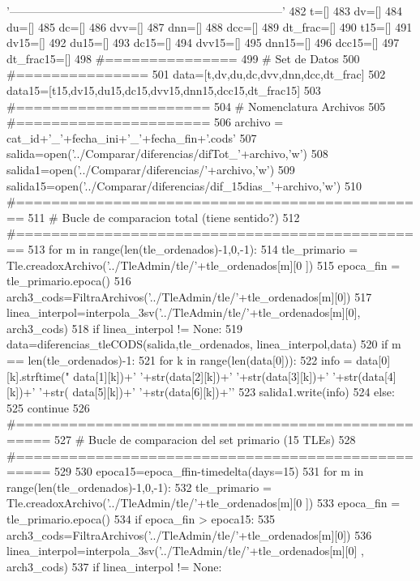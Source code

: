 \begin{DoxyCode}
       '------------------------------------------------------------------------'
482     t=[]
483     dv=[]
484     du=[]
485     dc=[]
486     dvv=[]
487     dnn=[]
488     dcc=[]
489     dt_frac=[]
490     t15=[]
491     dv15=[]
492     du15=[]
493     dc15=[]
494     dvv15=[]
495     dnn15=[]
496     dcc15=[]
497     dt_frac15=[]
498     #===============
499     # Set de Datos
500     #===============
501     data=[t,dv,du,dc,dvv,dnn,dcc,dt_frac]
502     data15=[t15,dv15,du15,dc15,dvv15,dnn15,dcc15,dt_frac15]
503     #======================
504     # Nomenclatura Archivos
505     #======================
506     archivo = cat_id+'_'+fecha_ini+'_'+fecha_fin+'.cods'    
507     salida=open('../Comparar/diferencias/difTot_'+archivo,'w')
508     salida1=open('../Comparar/diferencias/'+archivo,'w')
509     salida15=open('../Comparar/diferencias/dif_15dias_'+archivo,'w')
510     #===============================================
511     # Bucle de comparacion total  (tiene sentido?)
512     #===============================================
513     for m in range(len(tle_ordenados)-1,0,-1):
514         tle_primario = Tle.creadoxArchivo('../TleAdmin/tle/'+tle_ordenados[m][0
      ])
515         epoca_fin = tle_primario.epoca()
516         arch3_cods=FiltraArchivos('../TleAdmin/tle/'+tle_ordenados[m][0])
517         linea_interpol=interpola_3sv('../TleAdmin/tle/'+tle_ordenados[m][0], 
      arch3_cods)
518         if linea_interpol != None:                 
519             data=diferencias_tleCODS(salida,tle_ordenados, linea_interpol,data)
520             if m == len(tle_ordenados)-1:
521                 for k in range(len(data[0])):
522                     info = data[0][k].strftime("%
      data[1][k])+' '+str(data[2][k])+' '+str(data[3][k])+' '+str(data[4][k])+' '+str(
      data[5][k])+' '+str(data[6][k])+'\n'
523                     salida1.write(info)
524         else:
525             continue
526     #================================================== 
527     # Bucle de comparacion del set primario (15 TLEs)
528     #==================================================
529     
530     epoca15=epoca_ffin-timedelta(days=15)
531     for m in range(len(tle_ordenados)-1,0,-1):
532         tle_primario = Tle.creadoxArchivo('../TleAdmin/tle/'+tle_ordenados[m][0
      ])
533         epoca_fin = tle_primario.epoca()
534         if epoca_fin > epoca15:
535             arch3_cods=FiltraArchivos('../TleAdmin/tle/'+tle_ordenados[m][0])
536             linea_interpol=interpola_3sv('../TleAdmin/tle/'+tle_ordenados[m][0]
      , arch3_cods)
537             if linea_interpol != None:                   

\end{DoxyCode}
